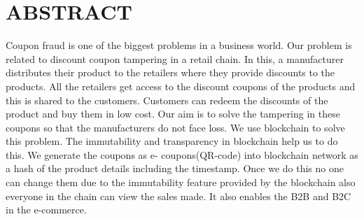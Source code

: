 \chapter*{\rm \large \bf ABSTRACT}
\vspace{4.0mm}
\setlength{\parindent}{4em}

\par
Coupon fraud is one of the biggest problems in a business world. Our problem is related
to discount coupon tampering in a retail chain. In this, a manufacturer distributes their product to
the retailers where they provide discounts to the products. All the retailers get access to the
discount coupons of the products and this is shared to the customers. Customers can redeem the
discounts of the product and buy them in low cost. Our aim is to solve the tampering in these
coupons so that the manufacturers do not face loss. We use blockchain to solve this problem. The
immutability and transparency in blockchain help us to do this. We generate the coupons as e-
coupons(QR-code) into blockchain network as a hash of the product details including the
timestamp. Once we do this no one can change them due to the immutability feature provided by the blockchain also everyone in the
chain can view the sales made. It also enables the B2B and B2C in the e-commerce.

\newpage 
